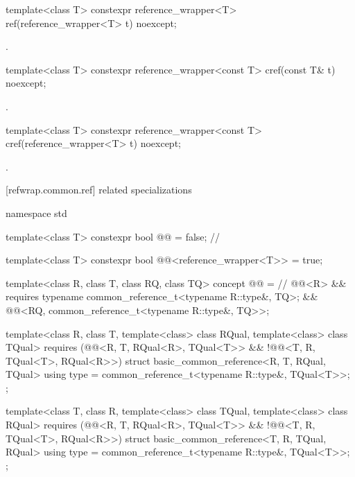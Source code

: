 %
\begin{itemdecl}
template<class T> constexpr reference_wrapper<T> ref(reference_wrapper<T> t) noexcept;
\end{itemdecl}

\begin{itemdescr}
\pnum
\returns
{}.
\end{itemdescr}

%
\begin{itemdecl}
template<class T> constexpr reference_wrapper<const T> cref(const T& t) noexcept;
\end{itemdecl}

\begin{itemdescr}
\pnum
\returns
{}.
\end{itemdescr}

%
\begin{itemdecl}
template<class T> constexpr reference_wrapper<const T> cref(reference_wrapper<T> t) noexcept;
\end{itemdecl}

\begin{itemdescr}
\pnum
\returns
{}.
\end{itemdescr}

[refwrap.common.ref]{ related specializations}

%
\begin{codeblock}
namespace std {
  template<class T>
    constexpr bool @@ = false;                              // \expos

  template<class T>
    constexpr bool @@<reference_wrapper<T>> = true;

  template<class R, class T, class RQ, class TQ>
    concept @@ =                     // \expos
      @@<R> &&
      requires { typename common_reference_t<typename R::type&, TQ>; } &&
      @@<RQ, common_reference_t<typename R::type&, TQ>>;

  template<class R, class T, template<class> class RQual, template<class> class TQual>
    requires (@@<R, T, RQual<R>, TQual<T>> &&
              !@@<T, R, TQual<T>, RQual<R>>)
  struct basic_common_reference<R, T, RQual, TQual> {
    using type = common_reference_t<typename R::type&, TQual<T>>;
  };

  template<class T, class R, template<class> class TQual, template<class> class RQual>
    requires (@@<R, T, RQual<R>, TQual<T>> &&
              !@@<T, R, TQual<T>, RQual<R>>)
  struct basic_common_reference<T, R, TQual, RQual> {
    using type = common_reference_t<typename R::type&, TQual<T>>;
  };
}
\end{codeblock}

